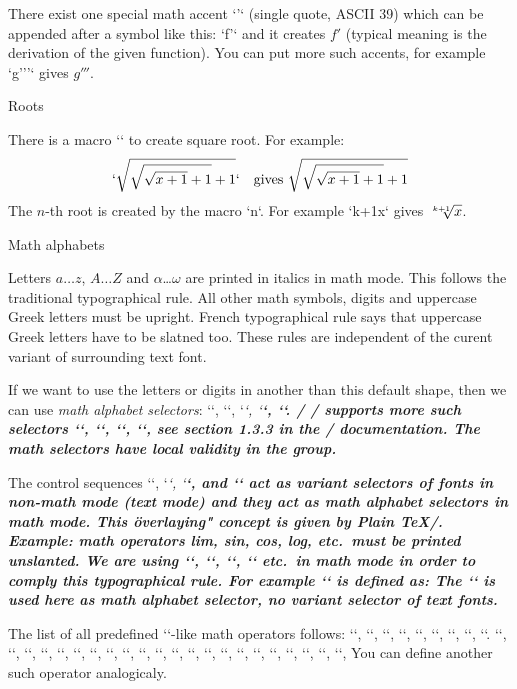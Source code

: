 There exist one special math accent `'` (single quote, ASCII 39)
which can be appended after a symbol like this: `f'`
and it creates $f'$ (typical meaning is the
derivation of the given function). You can put more such accents, for
example `g'''` gives $g'''$.

\secc Roots

There is a macro `` to create square root. For example:
$$
  `\sqrt{\sqrt{\sqrt{x+1}+1}+1}` \quad \hbox{gives }
   \sqrt{\sqrt{\sqrt{x+1}+1}+1}
$$
The $n$-th root is created by the macro `\root n`. For
example `\root k+1\of x` gives $\root k+1\of x$.

\secc Math alphabets

Letters $a\dots z$, $A\dots Z$ and $\alpha$\dots$\omega$ are printed in italics
in math mode. This follows the traditional typographical rule. 
All other math symbols, digits and uppercase Greek letters must be
upright.\fnote
{French typographical rule says that uppercase Greek letters have to be
 slatned too.}
These rules are independent of the curent variant of surrounding text font.

If we want to use the letters or digits
in another than this default shape, then we can use
{\em math alphabet selectors}: `\mit`, `\rm`, `\it`, `\bf`, `\cal`.
\new \OpTeX/
\OpTeX/ supports more such selectors `\script`, `\frak`, `\bbchar`, `\bi`, see
section 1.3.3 in the \OpTeX/ documentation. The math selectors have local
validity in the group.

The control sequences `\rm`, `\it`, `\bf`, and `\bi` act as variant selectors
of fonts in non-math mode (text mode) and they act 
as math alphabet selectors in math mode. This \"overlaying" concept 
is given by Plain \TeX/. Example: math operators lim, sin, cos,
log, etc.\ must be printed unslanted. We are using `\lim`, `\sin`, `\cos`,
`\log` etc.\ in math mode in order to comply this typographical rule. For
example `\sin` is defined as:
\begtt
\def\sin {\mathop{\rm sin}\nolimits}
\endtt
The `\rm` is used here as math alphabet selector, no variant selector of
text fonts.

The list of all predefined `\rm`-like math operators follows: `\arccos`,
`\arcsin`, `\arctan`, `\arg`, `\cos`, `\cosh`, `\cot`, `\coth`, `\deg`.
`\det`, `\dim`, `\exp`, `\gcd`, `\hom`, `\inf`, `\ker`, `\lg`, `\lim`,
`\liminf`, `\limsup`, `\ln`, `\log`, `\max`, `\min`, `\Pr`, `\scs`, `\sin`,
`\sinh`, `\sup`, `\tan`, `\tanh`, You can define another such operator
analogicaly.

